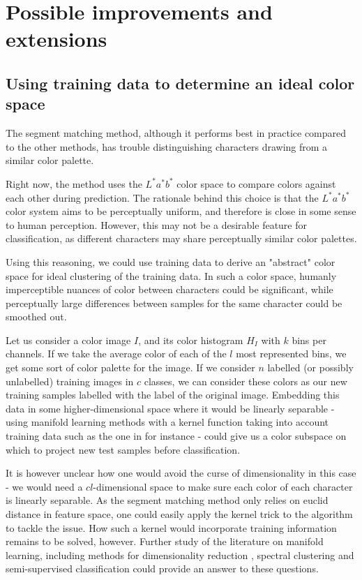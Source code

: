 \section{Possible improvements and extensions}
\label{sec:extensions}
\subsection{Using training data to determine an ideal color space}

The segment matching method, although it performs best in practice compared to the other methods, has trouble distinguishing characters drawing from a similar color palette.

Right now, the method uses the $L^*a^*b^*$ color space to compare colors against each other during prediction. The rationale behind this choice is that the $L^*a^*b^*$ color system aims to be perceptually uniform, and therefore is close in some sense to human perception. However, this may not be a desirable feature for classification, as different characters may share perceptually similar color palettes. 

Using this reasoning, we could use training data to derive an "abstract" color space for ideal clustering of the training data. In such a color space, humanly imperceptible nuances of color between characters could be significant, while perceptually large differences between samples for the same character could be smoothed out.

Let us consider a color image $I$, and its color histogram $H_I$ with $k$ bins per channels. If we take the average color of each of the $l$ most represented bins, we get some sort of color palette for the image. If we consider $n$ labelled (or possibly unlabelled) training images in $c$ classes, we can consider these colors as our new training samples labelled with the label of the original image. Embedding this data in some higher-dimensional space where it would be linearly separable - using manifold learning methods with a kernel function taking into account training data such as the one in \cite{urahama2007semi} for instance - could give us a color subspace on which to project new test samples before classification.

It is however unclear how one would avoid the curse of dimensionality in this case - we would need a $cl$-dimensional space to make sure each color of each character is linearly separable. As the segment matching method only relies on euclid distance in feature space, one could easily apply the kernel trick to the algorithm to tackle the issue. How such a kernel would incorporate training information remains to be solved, however. Further study of the literature on manifold learning, including methods for dimensionality reduction \cite{roweis2000nonlinear}
\cite{belkin2003laplacian}
\cite{saul2006spectral}, spectral clustering \cite{shi2000normalized}
\cite{grady2006isoperimetric}
\cite{ng2002spectral}
\cite{meila2001random} and semi-supervised classification \cite{urahama2007semi} could provide an answer to these questions.

